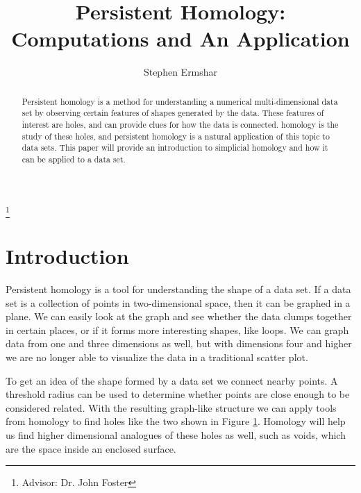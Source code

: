 

\title[Persistent Homology]{Persistent Homology: Computations and An Application}
\author{Stephen Ermshar}
\address{Department of Mathematics, Walla Walla University, College Place, WA 99324}
\date{} %
\thanks{Advisor: Dr. John Foster}





\begin{abstract}
    Persistent homology is a method for understanding a numerical multi-dimensional data set by observing certain features of shapes generated by the data.
    These features of interest are holes, and can provide clues for how the data is connected.
    homology is the study of these holes, and persistent homology is a natural application of this topic to data sets.
    This paper will provide an introduction to simplicial homology and how it can be applied to a data set.
\end{abstract}
\maketitle

\section{Introduction}

Persistent homology is a tool for understanding the shape of a data set.
If a data set is a collection of points in two-dimensional space, then it can be graphed in a plane.
We can easily look at the graph and see whether the data clumps together in certain places, or if it forms more interesting shapes, like loops.
We can graph data from one and three dimensions as well, but with dimensions four and higher we are no longer able to visualize the data in a traditional scatter plot.

\begin{figure}[h]
    \centering
    \scalebox{0.75}{}
    \caption{}
    \label{fig:persistence-demo-r25}
\end{figure}

To get an idea of the shape formed by a data set we connect nearby points.
A threshold radius can be used to determine whether points are close enough to be considered related.
With the resulting graph-like structure we can apply tools from homology to find holes like the two shown in Figure \ref{fig:persistence-demo-r25}.
Homology will help us find higher dimensional analogues of these holes as well, such as voids, which are the space inside an enclosed surface.

